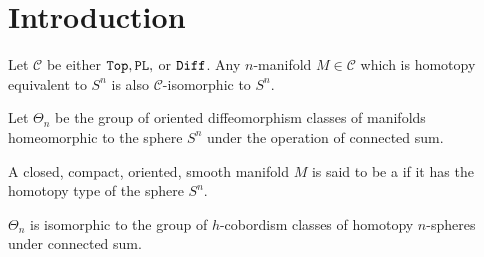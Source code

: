 \chapter{Introduction}


\begin{conjecture}\label{conj:generalized_poincare} Let $\mathscr{C}$ be either $\mathtt{Top}, \mathtt{PL},$ or $\mathtt{Diff}$. Any $n$-manifold $M\in \mathscr{C}$ which is homotopy equivalent to $S^n$ is also $\mathscr{C}$-isomorphic to $S^n$.
\end{conjecture}

\begin{definition}
  Let $\Theta_n$ be the group of oriented diffeomorphism classes of manifolds homeomorphic to the sphere $S^n$ under the operation of connected sum.
\end{definition}

\begin{definition}
  A closed, compact, oriented, smooth manifold $M$ is said to be a  if it has the homotopy type of the sphere $S^n$.
\end{definition}

\begin{theorem}
  $\Theta_n$ is isomorphic to the group of $h$-cobordism classes of homotopy $n$-spheres under connected sum.
\end{theorem}
